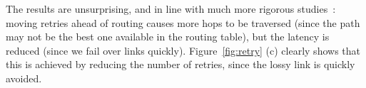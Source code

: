\documentclass[10pt,twocolumn]{article}
\newcommand{\note}[1]{}
\begin{document}
The results are unsurprising, and in line with much more rigorous
studies~\cite{rhea_usenix_2004,dabek_nsdi04}: moving retries ahead of
routing causes more hops to be traversed (since the path may not be
the best one available in the routing table), but the latency is
reduced (since we fail over links quickly).  Figure~\ref{fig:retry}
(c) clearly shows that this is achieved by reducing the number of
retries, since the lossy link is quickly avoided. 



\end{document}
